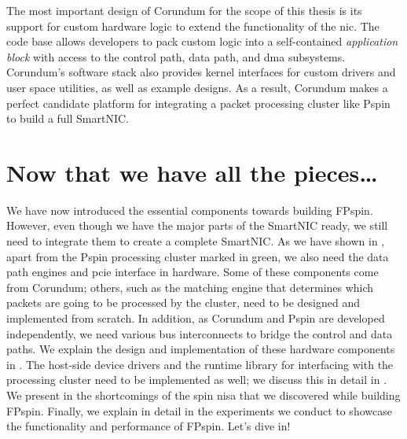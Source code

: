The most important design of Corundum for the scope of this thesis is its support for custom hardware logic to extend the functionality of the \ac{nic}.  The code base allows developers to pack custom logic into a self-contained \emph{application block} with access to the control path, data path, and \ac{dma} subsystems.  Corundum's software stack also provides kernel interfaces for custom drivers and user space utilities, as well as example designs.  As a result, Corundum makes a perfect candidate platform for integrating a packet processing cluster like P\acs{spin} to build a full SmartNIC.

\section*{Now that we have all the pieces\ldots}

We have now introduced the essential components towards building FP\acs{spin}.  However, even though we have the major parts of the SmartNIC ready, we still need to integrate them to create a complete SmartNIC.  As we have shown in , apart from the P\acs{spin} processing cluster marked in green, we also need the data path engines and \ac{pcie} interface in hardware.  Some of these components come from Corundum; others, such as the matching engine that determines which packets are going to be processed by the cluster, need to be designed and implemented from scratch.  In addition, as Corundum and P\acs{spin} are developed independently, we need various bus interconnects to bridge the control and data paths.  We explain the design and implementation of these hardware components in .  The host-side device drivers and the runtime library for interfacing with the processing cluster need to be implemented as well; we discuss this in detail in .  We present in  the shortcomings of the \ac{spin} \ac{nisa} that we discovered while building FP\acs{spin}.  Finally, we explain in detail in  the experiments we conduct to showcase the functionality and performance of FP\acs{spin}.  Let's dive in!
